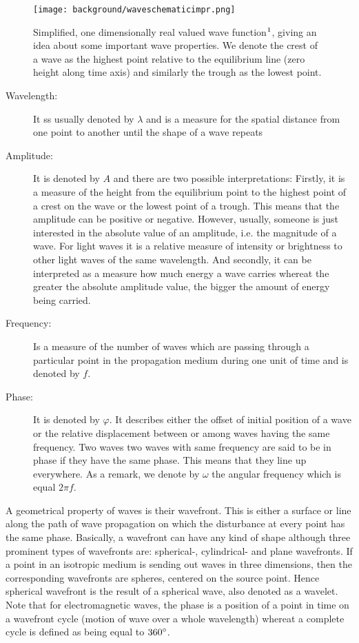 \begin{figure}[H]
  \centering
  \texttt{[image: background/waveschematicimpr.png]}
  \caption[Sinewave]{Simplified, one dimensionally real valued wave function$\footnotemark$, giving an idea about some important wave properties. We denote the crest of a wave as the highest point relative to the equilibrium line (zero height along time axis) and similarly the trough as the lowest point.}
  \label{fig:wavebasics}
\end{figure}

\begin{description}
  \item[Wavelength:] It ss usually denoted by $\lambda$ and is a measure for the spatial distance from one point to another until the shape of a wave repeats
  \item[Amplitude:] It is denoted by $A$ and there are two possible interpretations: Firstly, it is a measure of the height from the equilibrium point to the highest point of a crest on the wave or the lowest point of a trough. This means that the amplitude can be positive or negative. However, usually, someone is just interested in the absolute value of an amplitude, i.e. the magnitude of a wave. For light waves it is a relative measure of intensity or brightness to other light waves of the same wavelength. And secondly, it can be interpreted as a measure how much energy a wave carries whereat the greater the absolute amplitude value, the bigger the amount of energy being carried.
  \item[Frequency:] Is a measure of the number of waves which are passing through a particular point in the propagation medium during one unit of time and is denoted by $f$.
  \item[Phase:] It is denoted by $\varphi$. It describes either the offset of initial position of a wave or the relative displacement between or among waves having the same frequency. Two waves two waves with same frequency are said to be in phase if they have the same phase. This means that they line up everywhere. As a remark, we denote by $\omega$ the angular frequency which is equal $2\pi f$. 
\end{description}

A geometrical property of waves is their wavefront. This is either a surface or line along the path of wave propagation on which the disturbance at every point has the same phase. Basically, a wavefront can have any kind of shape although three prominent types of wavefronts are: spherical-, cylindrical- and plane wavefronts. If a point in an isotropic medium is sending out waves in three dimensions, then the corresponding wavefronts are spheres, centered on the source point. Hence spherical wavefront is the result of a spherical wave, also denoted as a wavelet. Note that for electromagnetic waves, the phase is a position of a point in time on a wavefront cycle (motion of wave over a whole wavelength) whereat a complete cycle is defined as being equal to $360\degree$.

